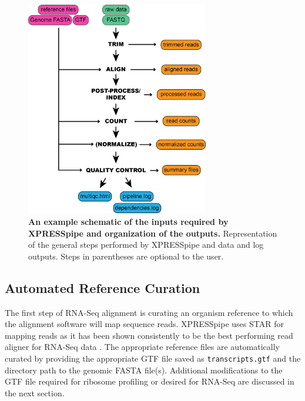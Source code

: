 \documentclass[10pt, oneside]{article}
\begin{document}
\begin{figure}
\centering
  \includegraphics[width=80mm]{figures/xpresspipe_figure1.png}
  \caption{\textbf{An example schematic of the inputs required by XPRESSpipe and organization of the outputs.} Representation of the general steps performed by XPRESSpipe and data and log outputs. Steps in parentheses are optional to the user.}
  \label{fig:outputs}
\end{figure}

\subsection*{Automated Reference Curation}
The first step of RNA-Seq alignment is curating an organism reference to which the alignment software will map sequence reads. XPRESSpipe uses STAR \cite{star} for mapping reads as it has been shown consistently to be the best performing read aligner for RNA-Seq data \cite{alignment_benchmark}. The appropriate reference files are automatically curated by providing the appropriate GTF file saved as \texttt{transcripts.gtf} and the directory path to the genomic FASTA file(s). Additional modifications to the GTF file required for ribosome profiling or desired for RNA-Seq are discussed in the next section.\\
\end{document}
